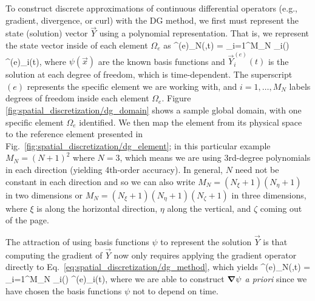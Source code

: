 \documentclass{article}
\begin{document}
To construct discrete approximations of continuous differential operators (e.g., gradient, divergence, or curl) with the DG method, we first must represent the state (solution) vector $\vec{Y}$ using a polynomial representation.  That is, we represent the state vector inside of each element $\Omega_e$ as
\be
{}^{(e)}_N(,t) = \sum_{i=1}^{M_N} \psi_i() ^{(e)}_i(t),
\label{eq:spatial_discretization/dg_method}
\ee
where $\psi(\vec{x})$ are the known basis functions and $\vec{Y}^{(e)}_i(t)$ is the solution at each degree of freedom, which is time-dependent. The superscript $(e)$ represents the specific element we are working with, and $i=1,\ldots,M_N$ labels degrees of freedom inside each element $\Omega_e$.  Figure \ref{fig:spatial_discretization/dg_domain} shows a sample global domain, with one specific element $\Omega_e$ identified.  We then map the element from its physical space to the reference element presented in Fig.\ \ref{fig:spatial_discretization/dg_element}; in this particular example $M_N=(N+1)^2$ where $N=3$, which means we are using 3rd-degree polynomials in each direction (yielding 4th-order accuracy).  In general, $N$ need not be constant in each direction and so we can also write $M_N=(N_{\xi}+1)(N_{\eta}+1)$ in two dimensions or $M_N=(N_{\xi}+1)(N_{\eta}+1)(N_{\zeta}+1)$ in three dimensions, where $\xi$ is along the horizontal direction, $\eta$ along the vertical, and $\zeta$ coming out of the page. 

The attraction of using basis functions $\psi$ to represent the solution $\vec{Y}$ is that computing the gradient of $\vec{Y}$ now only requires applying the gradient operator directly to Eq.~\eqref{eq:spatial_discretization/dg_method}, which yields
\be
\nabla {}^{(e)}_N(,t) = \sum_{i=1}^{M_N} \nabla \psi_i() ^{(e)}_i(t),
\label{eq:spatial_discretization/dg_method/gradient}
\ee
where we are able to construct $\boldsymbol{{\nabla}} \psi$ \emph{a priori} since we have chosen the basis functions $\psi$ not to depend on time.
\end{document}
